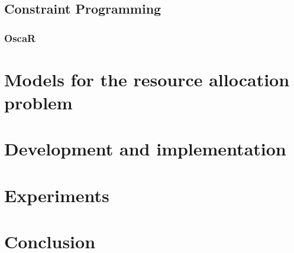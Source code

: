 \documentclass{template/EPL-master-thesis-covers-EN}
\begin{document}
  \section{Constraint Programming}
  

  \subsection{OscaR}
  \label{subsection:oscar}
  
  
  \chapter{Models for the resource allocation problem}
  \label{chapter:models}

  
  
  
  

  \chapter{Development and implementation}
  \label{chapter:implementation}
  


  \chapter{Experiments}
  \label{chapter:experiments}
  
  

  \chapter{Conclusion}
  \label{chapter:conclusion}

   
  

  \backcoverpage
\end{document}
